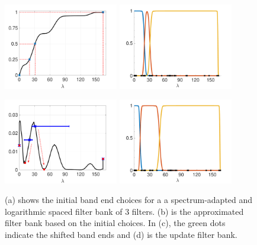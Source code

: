\documentclass[a4paper]{article}
\theoremstyle{definition}
\begin{document}
\begin{figure}[h!]
\centering
\includegraphics[width = 5cm]{cdf.pdf}
\includegraphics[width = 5cm]{original filter bank.pdf}

\includegraphics[width = 5cm]{pdf.pdf}
\includegraphics[width = 5cm]{updated filter bank.pdf}

\caption{(a) shows the initial band end choices for a a spectrum-adapted and logarithmic spaced filter bank of 3 filters. (b) is the approximated filter bank based on the initial choices. In (c), the green dots indicate the shifted band ends and (d) is the update filter bank.}
\end{figure}
\end{document}
